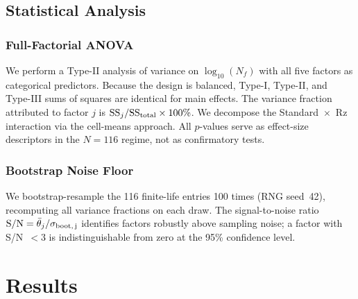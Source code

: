 \documentclass[12pt,a4paper]{article}
\begin{document}
\subsection{Statistical Analysis}

\subsubsection{Full-Factorial ANOVA}

We perform a Type-II analysis of variance on $\log_{10}(N_f)$ with all
five factors as categorical predictors. Because the design is balanced,
Type-I, Type-II, and Type-III sums of squares are identical for main
effects. The variance fraction attributed to factor $j$ is
$\mathrm{SS}_j / \mathrm{SS}_{\rm total} \times 100\%$. We decompose
the Standard~$\times$~Rz interaction via the cell-means approach.
All $p$-values serve as effect-size descriptors in the $N=116$ regime,
not as confirmatory tests.

\subsubsection{Bootstrap Noise Floor}

We bootstrap-resample the 116 finite-life entries 100 times (RNG
seed~42), recomputing all variance fractions on each draw. The
signal-to-noise ratio $\mathrm{S/N} = \bar{\theta}_j /
\sigma_{\rm boot,\,j}$ identifies factors robustly above sampling noise;
a factor with S/N~$<3$ is indistinguishable from zero at the 95\%
confidence level.

\section{Results}
\label{sec:results}
\end{document}
